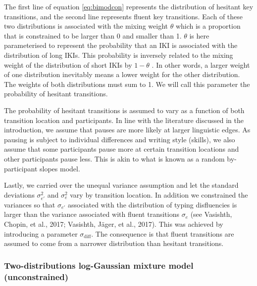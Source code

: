 \documentclass[
  man,floatsintext]{apa7}
\begin{document}
The first line of equation \ref{eq:bimodcon} represents the distribution of hesitant key transitions, and the second line represents fluent key transitions. Each of these two distributions is associated with the mixing weight \(\theta\) which is a proportion that is constrained to be larger than 0 and smaller than 1. \(\theta\) is here parameterised to represent the probability that an IKI is associated with the distribution of long IKIs. This probability is inversely related to the mixing weight of the distribution of short IKIs by \(1-\theta\) . In other words, a larger weight of one distribution inevitably means a lower weight for the other distribution. The weights of both distributions must sum to 1. We will call this parameter the probability of hesitant transitions.

The probability of hesitant transitions is assumed to vary as a function of both transition location and participants. In line with the literature discussed in the introduction, we assume that pauses are more likely at larger linguistic edges. As pausing is subject to individual differences and writing style (skills), we also assume that some participants pause more at certain transition locations and other participants pause less. This is akin to what is known as a random by-participant slopes model.

Lastly, we carried over the unequal variance assumption and let the standard deviations \(\sigma_{e'}^2\) and \(\sigma_{e}^2\) vary by transition location. In addition we constrained the variances so that \(\sigma_{e'}\) associated with the distribution of typing disfluencies is larger than the variance associated with fluent transitions \(\sigma_e\) (see Vasishth, Chopin, et al., 2017; Vasishth, Jäger, et al., 2017). This was achieved by introducing a parameter \(\sigma_\text{diff}\). The consequence is that fluent transitions are assumed to come from a narrower distribution than hesitant transitions.

\hypertarget{two-distributions-log-gaussian-mixture-model-unconstrained}{%
\subsubsection{Two-distributions log-Gaussian mixture model (unconstrained)}\label{two-distributions-log-gaussian-mixture-model-unconstrained}}
\end{document}

